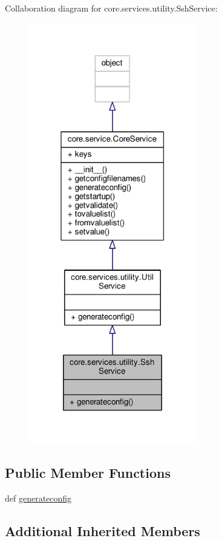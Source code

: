 Collaboration diagram for core.\+services.\+utility.\+Ssh\+Service\+:
\nopagebreak
\begin{figure}[H]
\begin{center}
\leavevmode
\includegraphics[width=207pt]{classcore_1_1services_1_1utility_1_1_ssh_service__coll__graph}
\end{center}
\end{figure}
\subsection*{Public Member Functions}
\begin{DoxyCompactItemize}
\item 
def \hyperlink{classcore_1_1services_1_1utility_1_1_ssh_service_a4e30655b48b0f2756239a5971697a64d}{generateconfig}
\end{DoxyCompactItemize}
\subsection*{Additional Inherited Members}



